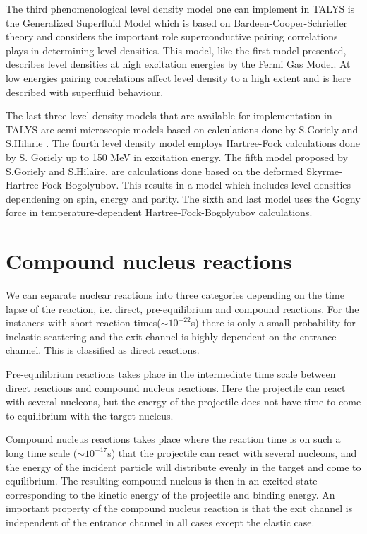 \documentclass[a4paper,english]{article}
\begin{document}
The third phenomenological level density model one can implement in TALYS is the Generalized Superfluid Model\cite{Ignatyuk1993} which is based on Bardeen-Cooper-Schrieffer theory and considers the important role superconductive pairing correlations plays in determining level densities. This model, like the first model presented, describes level densities at high excitation energies by the Fermi Gas Model. At low energies pairing correlations affect level density to a high extent and is here described with superfluid behaviour. 

The last three level density models that are available for implementation in TALYS are semi-microscopic models based on calculations done by S.Goriely and S.Hilarie \cite{manual}. The fourth level density model employs Hartree-Fock calculations done by S. Goriely up to 150 MeV in excitation energy. The fifth model proposed by S.Goriely and S.Hilaire, are calculations done based on the deformed Skyrme-Hartree-Fock-Bogolyubov. This results in a model which includes level densities dependening on spin, energy and parity. The sixth and last model uses the Gogny force in temperature-dependent Hartree-Fock-Bogolyubov calculations.

\section{Compound nucleus reactions}
We can separate nuclear reactions into three categories depending on the time lapse of the reaction, i.e. direct, pre-equilibrium and compound reactions.  For the instances with short reaction times($\sim{10^{-22}}$s) there is only a small probability for inelastic scattering and the exit channel is highly dependent on the entrance channel. This is classified as direct reactions.

Pre-equilibrium reactions takes place in the intermediate time scale between direct reactions and compound nucleus reactions. Here the projectile can react with several nucleons, but the energy of the projectile does not have time to come to equilibrium with the target nucleus. 

Compound nucleus reactions takes place where the reaction time is on such a long time scale ($\sim{10^{-17}}$s) that the projectile can react with several nucleons, and the energy of the incident particle will distribute evenly in the target and come to equilibrium. The resulting compound nucleus is then in an excited state corresponding to the kinetic energy of the projectile and binding energy. An important property of the compound nucleus reaction is that the exit channel is independent of the entrance channel in all cases except the elastic case.
\end{document}
